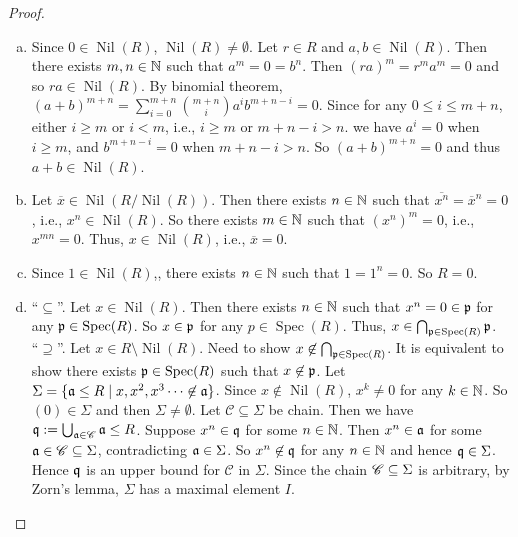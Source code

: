 \begin{proof}
    \begin{enumerate}[(a)]
        \item Since $0 \in \operatorname{Nil}(R)$, $\operatorname{Nil}(R) \neq \emptyset$. Let $r \in R$ and $a,b \in \operatorname{Nil}(R)$. Then there exists $m,n \in \mathbb{N}$ such that $a^m = 0 = b^n$. Then $(ra)^m = r^ma^m = 0$ and so $ra \in \operatorname{Nil}(R)$. By binomial theorem, $(a+b)^{m+n} = \sum_{i=0}^{m+n} \binom {m+n} i a^i b^{m+n-i} = 0$. Since for any $0 \leq i \leq m+n$, either $i \geq m$ or $i < m$, i.e., $i \geq m$ or $m+n-i > n$. we have $a^i = 0$ when $i \geq m$, and $b^{m+n-i} = 0 $ when $m + n-i > n$. So $(a+b)^{m+n} = 0$ and thus $a+b \in \operatorname{Nil}(R)$.
        \item Let $\overbar x \in \operatorname{Nil}(R/\operatorname{Nil}(R))$. Then there exists $n \in \mathbb{N}$ such that $\overbar {x^n} = \overbar x^n = 0$, i.e., $x^n \in \operatorname{Nil}(R)$. So there exists $m \in \mathbb{N}$ such that $(x^n)^m = 0$, i.e., $x^{mn} = 0$. Thus, $x \in \operatorname{Nil}(R)$, i.e., $\overbar x = 0$.
        \item Since $1 \in \operatorname{Nil}(R)$,, there exists $n \in \mathbb{N}$ such that $1 = 1^n = 0$. So $R = 0$.
        \item ``$\subseteq$''. Let $x \in \operatorname{Nil}(R)$. Then there exists $n \in \mathbb{N}$ such that $x^n = 0 \in \mathfrak{p}$ for any $\mathfrak{p} \in \operatorname{Spec}(R)$. So $x \in \mathfrak{p}$ for any $p \in \operatorname{Spec}(R)$. Thus, $x \in \bigcap_{\mathfrak{p} \in \operatorname{Spec}(R)} \mathfrak{p}$. \\
            ``$\supseteq$''. Let $x \in R \setminus \operatorname{Nil}(R)$. Need to show $x \not \in \bigcap_{\mathfrak{p} \in \operatorname{Spec}(R)}$. It is equivalent to show there exists $\mathfrak{p} \in \operatorname{Spec}(R)$ such that $x \not \in \mathfrak{p}$. Let $\Sigma = \{\mathfrak{a} \leq R \mid x,x^2,x^3 \cdots \not \in \mathfrak{a}\}$. Since $x \not \in \operatorname{Nil}(R)$, $x^k \neq 0$ for any $k \in \mathbb{N}$. So $(0) \in \Sigma$ and then $\Sigma \neq \emptyset$. Let $\mathscr C \subseteq \Sigma$ be chain. Then we have $\mathfrak{q} := \bigcup_{\mathfrak{a} \in \mathscr C} \mathfrak{a} \leq R$. Suppose $x^n \in \mathfrak{q}$ for some $n \in \mathbb{N}$. Then $x^n \in \mathfrak{a}$ for some $\mathfrak{a} \in \mathscr C \subseteq \Sigma$, contradicting $\mathfrak{a} \in \Sigma$. So $x^n \not \in \mathfrak{q}$ for any $n \in \mathbb{N}$ and hence $\mathfrak{q} \in \Sigma$. Hence $\mathfrak{q}$ is an upper bound for $\mathscr C$ in $\Sigma$. Since the chain $\mathscr{C} \subseteq \Sigma$ is arbitrary, by Zorn's lemma, $\Sigma$ has a maximal element $I$. \\

\end{enumerate}
\end{proof}
